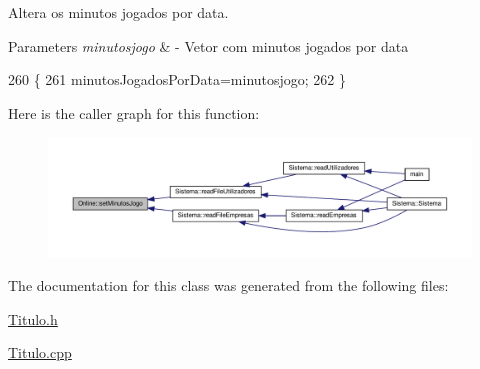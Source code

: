 Altera os minutos jogados por data. 


\begin{DoxyParams}{Parameters}
{\em minutosjogo} & -\/ Vetor com minutos jogados por data \\
\hline
\end{DoxyParams}

\begin{DoxyCode}
260                                                                \{
261     minutosJogadosPorData=minutosjogo;
262 \}
\end{DoxyCode}
Here is the caller graph for this function\+:
\nopagebreak
\begin{figure}[H]
\begin{center}
\leavevmode
\includegraphics[width=350pt]{classOnline_a71cc818cd9b8020a470efc14f636a9f9_icgraph}
\end{center}
\end{figure}


The documentation for this class was generated from the following files\+:\begin{DoxyCompactItemize}
\item 
\hyperlink{Titulo_8h}{Titulo.\+h}\item 
\hyperlink{Titulo_8cpp}{Titulo.\+cpp}\end{DoxyCompactItemize}
